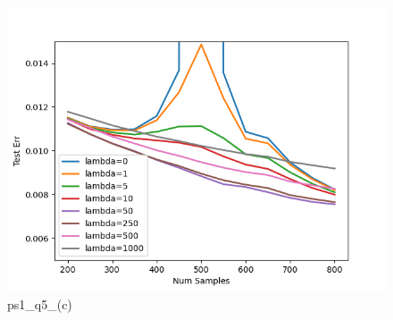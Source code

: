 
\begin{answer}

\begin{figure}[H]
    \centering
    \includegraphics[width=0.5\linewidth]{reg.png}
    \caption{ps1\_q5\_(c)}
    \label{fig:enter-label}
\end{figure}

\end{answer}
